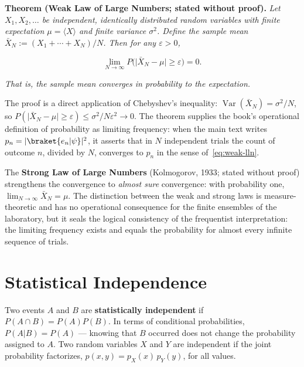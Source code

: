 \medskip\noindent\textbf{Theorem (Weak Law of Large Numbers; stated without proof).} \emph{Let $X_1, X_2, \ldots$ be independent, identically distributed random variables with finite expectation $\mu = \langle X \rangle$ and finite variance $\sigma^2$. Define the sample mean $\bar{X}_N := (X_1 + \cdots + X_N)/N$. Then for any $\varepsilon > 0$,}
\begin{linenomath}
    \begin{equation}
        \lim_{N \to \infty} P\bigl(\lvert\bar{X}_N - \mu\rvert \ge \varepsilon\bigr) = 0.
        \label{eq:weak-lln}
    \end{equation}
\end{linenomath}
\emph{That is, the sample mean converges in probability to the expectation.}

The proof is a direct application of Chebyshev's inequality: $\operatorname{Var}(\bar{X}_N) = \sigma^2/N$, so $P(\lvert\bar{X}_N - \mu\rvert \ge \varepsilon) \le \sigma^2/N\varepsilon^2 \to 0$. The theorem supplies the book's operational definition of probability as limiting frequency: when the main text writes $p_n = \lvert\braket{e_n|\psi}\rvert^2$, it asserts that in $N$ independent trials the count of outcome $n$, divided by $N$, converges to $p_n$ in the sense of~\eqref{eq:weak-lln}.

The \textbf{Strong Law of Large Numbers} (Kolmogorov, 1933; stated without proof) strengthens the convergence to \emph{almost sure} convergence: with probability one, $\lim_{N \to \infty} \bar{X}_N = \mu$. The distinction between the weak and strong laws is measure-theoretic and has no operational consequence for the finite ensembles of the laboratory, but it seals the logical consistency of the frequentist interpretation: the limiting frequency exists and equals the probability for almost every infinite sequence of trials.

\section{Statistical Independence}
\label{sec:statistical-independence}

Two events $A$ and $B$ are \textbf{statistically independent} if $P(A \cap B) = P(A)P(B)$. In terms of conditional probabilities, $P(A|B) = P(A)$ --- knowing that $B$ occurred does not change the probability assigned to $A$. Two random variables $X$ and $Y$ are independent if the joint probability factorizes, $p(x,y) = p_X(x)\,p_Y(y)$, for all values.


